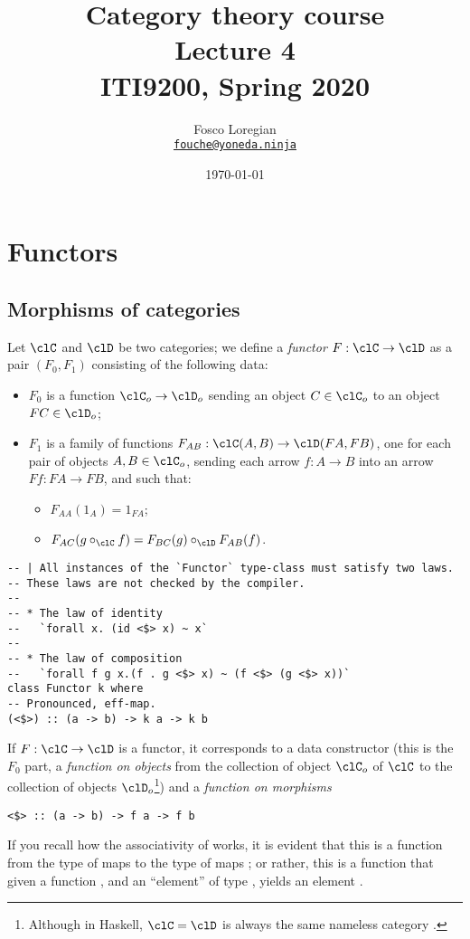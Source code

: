 \documentclass[11pt]{article}
\author{ Fosco Loregian \\
  \href{mailto:fouche@yoneda.ninja}
       {\tt fouche@yoneda.ninja}}
\date{\today}
\title{  Category theory course 
			\\ Lecture 4
			\\ ITI9200, Spring 2020
			}
\begin{document}
\maketitle
\tableofcontents
\section{Functors}
\subsection{Morphisms of categories}
\begin{definition}[Functor]
	Let $\clC$ and $\clD$ be two categories; we define a \emph{functor} $F :\clC\to \clD$ as a pair $(F_0, F_1)$ consisting of the following data:
	\begin{itemize}
		\item  $F_0$ is a function $ \clC_o\to  \clD_o$ sending an object $C\in \clC_o$ to an object $FC \in \clD_o$;
		\item  $F_1$ is a family of functions $F_{AB} : \clC(A,B)\to \clD(FA,FB)$, one for each pair of objects $A,B\in\clC_o$, sending each arrow $f:A\to B$ into an arrow $Ff:FA\to FB$, and such that:
		\begin{itemize}
			\item $F_{AA} (1_A)=1_{F A}$;
			\item $F_{AC} (g\circ_\clC f)=F_{BC} (g)\circ_\clD F_{AB} (f)$.
		\end{itemize}
	\end{itemize}
\end{definition}
\begin{verbatim}
-- | All instances of the `Functor` type-class must satisfy two laws.
-- These laws are not checked by the compiler.
--
-- * The law of identity
--   `forall x. (id <$> x) ~ x`
--
-- * The law of composition
--   `forall f g x.(f . g <$> x) ~ (f <$> (g <$> x))`
class Functor k where
-- Pronounced, eff-map.
(<$>) :: (a -> b) -> k a -> k b
\end{verbatim}
If $F : \clC \to \clD$ is a functor, it corresponds to a data constructor  (this is  the $F_0$ part, a \emph{function on objects} from the collection of object $\clC_o$ of $\clC$ to the collection of objects $\clD_o$\footnote{Although in Haskell, $\clC=\clD$ is always the same nameless category \mil{*}.}) and a \emph{function on morphisms}
\begin{verbatim}
<$> :: (a -> b) -> f a -> f b
\end{verbatim}
If you recall how the associativity of \mil{->} works, it is evident that this is a function from the type of maps  to the type of maps ; or rather, this is a function that given a function , and an ``element'' of type , yields an element .
\end{document}
